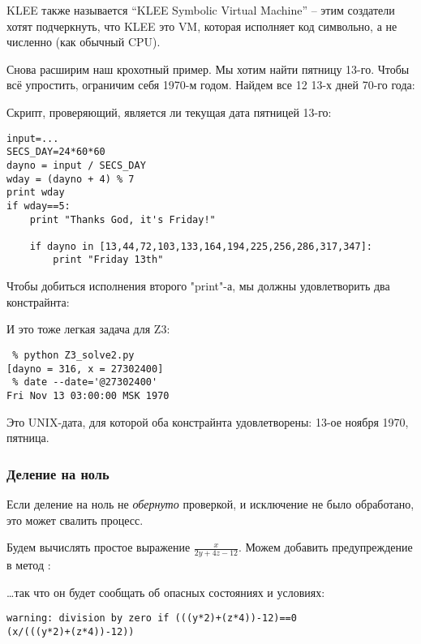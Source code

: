 KLEE также называется ``KLEE Symbolic Virtual Machine'' -- этим создатели хотят подчеркнуть, что KLEE это \ac{VM},
которая исполняет код символьно, а не численно (как обычный \ac{CPU}).

Снова расширим наш крохотный пример.
Мы хотим найти пятницу 13-го. Чтобы всё упростить, ограничим себя 1970-м годом.
Найдем все 12 13-х дней 70-го года:



Скрипт, проверяющий, является ли текущая дата пятницей 13-го:

\begin{lstlisting}
input=...
SECS_DAY=24*60*60
dayno = input / SECS_DAY
wday = (dayno + 4) % 7
print wday
if wday==5:
    print "Thanks God, it's Friday!"
 
    if dayno in [13,44,72,103,133,164,194,225,256,286,317,347]:
        print "Friday 13th"
\end{lstlisting}

Чтобы добиться исполнения второго "print"-а, мы должны удовлетворить два констрайнта:



И это тоже легкая задача для Z3:

\begin{lstlisting}
 % python Z3_solve2.py
[dayno = 316, x = 27302400]
 % date --date='@27302400'
Fri Nov 13 03:00:00 MSK 1970
\end{lstlisting}

Это UNIX-дата, для которой оба констрайнта удовлетворены: 13-ое ноября 1970, пятница.

\subsubsection{Деление на ноль}

Если деление на ноль не \textit{обернуто} проверкой, и исключение не было обработано, это может свалить процесс.

Будем вычислять простое выражение $\frac{x}{2y + 4z - 12}$.
Можем добавить предупреждение в метод :



\dots так что он будет сообщать об опасных состояниях и условиях:

\begin{lstlisting}
warning: division by zero if (((y*2)+(z*4))-12)==0
(x/(((y*2)+(z*4))-12))
\end{lstlisting}

